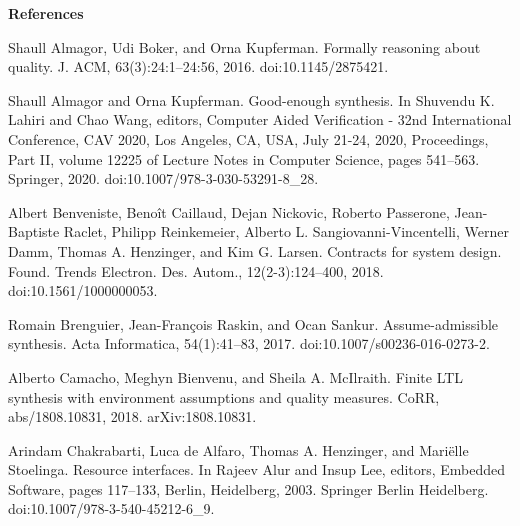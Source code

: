 \documentclass[10pt,a4paper]{article}
\begin{document}
 
 
\par
 
 
 


 
\par\medskip\noindent\textbf{References}\par
  
\par\noindent  [1]  Shaull Almagor, Udi Boker, and Orna Kupferman.  Formally reasoning about quality.  J. ACM, 63(3):24:1–24:56, 2016.  doi:10.1145/2875421.  
 
\par\noindent  [2]  Shaull Almagor and Orna Kupferman.  Good-enough synthesis.  In Shuvendu K. Lahiri and Chao Wang, editors, Computer Aided Verification - 32nd International Conference, CAV 2020, Los Angeles, CA, USA, July 21-24, 2020, Proceedings, Part II, volume 12225 of Lecture Notes in Computer Science, pages 541–563. Springer, 2020.  doi:10.1007/978-3-030-53291-8\_28.  
 
\par\noindent  [3]  Albert Benveniste, Benoît Caillaud, Dejan Nickovic, Roberto Passerone, Jean-Baptiste Raclet, Philipp Reinkemeier, Alberto L. Sangiovanni-Vincentelli, Werner Damm, Thomas A. Henzinger, and Kim G. Larsen.  Contracts for system design.  Found. Trends Electron. Des. Autom., 12(2-3):124–400, 2018.  doi:10.1561/1000000053.  
 
\par\noindent  [4]  Romain Brenguier, Jean-François Raskin, and Ocan Sankur.  Assume-admissible synthesis.  Acta Informatica, 54(1):41–83, 2017.  doi:10.1007/s00236-016-0273-2.  
 
\par\noindent  [5]  Alberto Camacho, Meghyn Bienvenu, and Sheila A. McIlraith.  Finite LTL synthesis with environment assumptions and quality measures.  CoRR, abs/1808.10831, 2018.  arXiv:1808.10831.  
 
\par\noindent  [6]  Arindam Chakrabarti, Luca de Alfaro, Thomas A. Henzinger, and Mariëlle Stoelinga.  Resource interfaces.  In Rajeev Alur and Insup Lee, editors, Embedded Software, pages 117–133, Berlin, Heidelberg, 2003. Springer Berlin Heidelberg.  doi:10.1007/978-3-540-45212-6\_9.  
 
\end{document}
